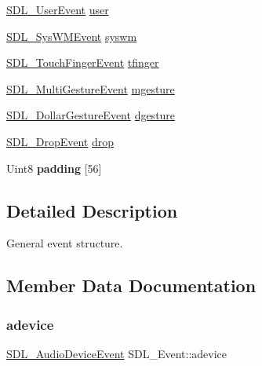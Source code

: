 \begin{DoxyCompactItemize}
\mbox{\hyperlink{struct_s_d_l___user_event}{S\+D\+L\+\_\+\+User\+Event}} \mbox{\hyperlink{union_s_d_l___event_ab7c394e3ce7bf1e4f8d68bc0e9f1b042}{user}}
\item 
\mbox{\hyperlink{struct_s_d_l___sys_w_m_event}{S\+D\+L\+\_\+\+Sys\+W\+M\+Event}} \mbox{\hyperlink{union_s_d_l___event_ab3b2eaf5348d4c50a51b1f297fdef537}{syswm}}
\item 
\mbox{\hyperlink{struct_s_d_l___touch_finger_event}{S\+D\+L\+\_\+\+Touch\+Finger\+Event}} \mbox{\hyperlink{union_s_d_l___event_ab18d7d60794cb056948ffa58541bc3c5}{tfinger}}
\item 
\mbox{\hyperlink{struct_s_d_l___multi_gesture_event}{S\+D\+L\+\_\+\+Multi\+Gesture\+Event}} \mbox{\hyperlink{union_s_d_l___event_ac19b3c6a6b5181a51eb4fbe2cbe726a9}{mgesture}}
\item 
\mbox{\hyperlink{struct_s_d_l___dollar_gesture_event}{S\+D\+L\+\_\+\+Dollar\+Gesture\+Event}} \mbox{\hyperlink{union_s_d_l___event_a4481167b9f8549aeb254e97ca812e74d}{dgesture}}
\item 
\mbox{\hyperlink{struct_s_d_l___drop_event}{S\+D\+L\+\_\+\+Drop\+Event}} \mbox{\hyperlink{union_s_d_l___event_acff77bccbca65abbb876360a3f5209c9}{drop}}
\item 
\mbox{\label{union_s_d_l___event_aabb599570edfa54aad6255c1f24f2ad2}} 
Uint8 {\bfseries padding} \mbox{[}56\mbox{]}
\end{DoxyCompactItemize}


\subsection{Detailed Description}
General event structure. 

\subsection{Member Data Documentation}
\mbox{\label{union_s_d_l___event_a111e01fcac4fd8e251a6058ff9f17e72}} 
\subsubsection{\texorpdfstring{adevice}{adevice}}
{\footnotesize\ttfamily \mbox{\hyperlink{struct_s_d_l___audio_device_event}{S\+D\+L\+\_\+\+Audio\+Device\+Event}} S\+D\+L\+\_\+\+Event\+::adevice}

